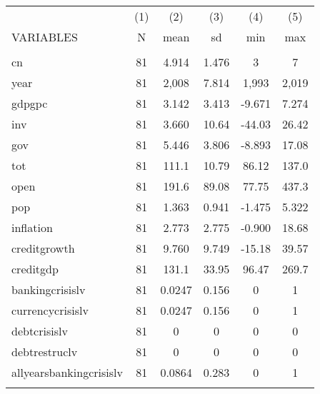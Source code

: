 \documentclass[]{article}
\begin{document}
\begin{tabular}{lccccc} \hline
 & (1) & (2) & (3) & (4) & (5) \\
VARIABLES & N & mean & sd & min & max \\ \hline
 &  &  &  &  &  \\
cn & 81 & 4.914 & 1.476 & 3 & 7 \\
year & 81 & 2,008 & 7.814 & 1,993 & 2,019 \\
gdpgpc & 81 & 3.142 & 3.413 & -9.671 & 7.274 \\
inv & 81 & 3.660 & 10.64 & -44.03 & 26.42 \\
gov & 81 & 5.446 & 3.806 & -8.893 & 17.08 \\
tot & 81 & 111.1 & 10.79 & 86.12 & 137.0 \\
open & 81 & 191.6 & 89.08 & 77.75 & 437.3 \\
pop & 81 & 1.363 & 0.941 & -1.475 & 5.322 \\
inflation & 81 & 2.773 & 2.775 & -0.900 & 18.68 \\
creditgrowth & 81 & 9.760 & 9.749 & -15.18 & 39.57 \\
creditgdp & 81 & 131.1 & 33.95 & 96.47 & 269.7 \\
bankingcrisislv & 81 & 0.0247 & 0.156 & 0 & 1 \\
currencycrisislv & 81 & 0.0247 & 0.156 & 0 & 1 \\
debtcrisislv & 81 & 0 & 0 & 0 & 0 \\
debtrestruclv & 81 & 0 & 0 & 0 & 0 \\
allyearsbankingcrisislv & 81 & 0.0864 & 0.283 & 0 & 1 \\
 &  &  &  &  &  \\ \hline
\end{tabular}
\end{document}
